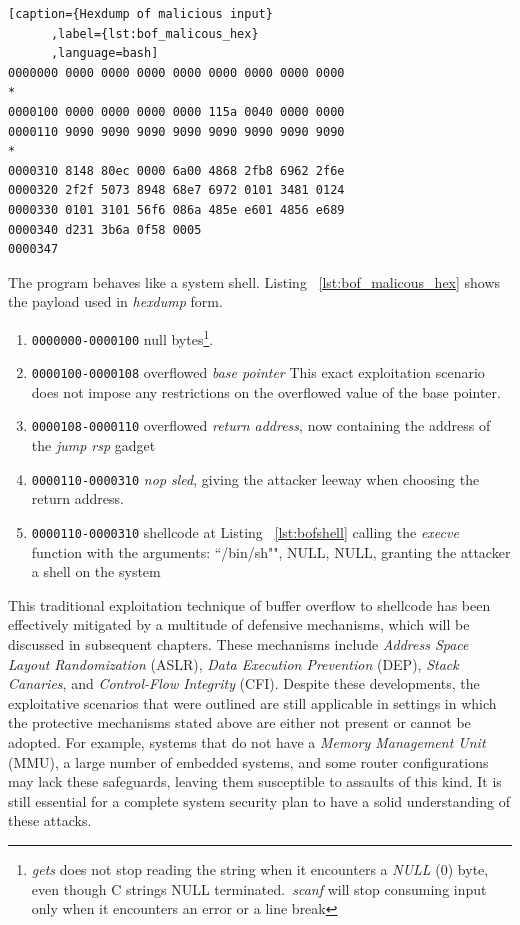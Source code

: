 \documentclass{article}
\begin{document}
\begin{lstlisting}[caption={Hexdump of malicious input}
      ,label={lst:bof_malicous_hex}
      ,language=bash]
0000000 0000 0000 0000 0000 0000 0000 0000 0000
*
0000100 0000 0000 0000 0000 115a 0040 0000 0000
0000110 9090 9090 9090 9090 9090 9090 9090 9090
*
0000310 8148 80ec 0000 6a00 4868 2fb8 6962 2f6e
0000320 2f2f 5073 8948 68e7 6972 0101 3481 0124
0000330 0101 3101 56f6 086a 485e e601 4856 e689
0000340 d231 3b6a 0f58 0005
0000347
\end{lstlisting}
The program behaves like a system shell. Listing ~\ref{lst:bof_malicous_hex} shows the payload used in \emph{hexdump} form. 
\begin{enumerate}
  \item \texttt{0000000-0000100} null bytes\footnote{\emph{gets} does not stop reading the string when it encounters a \emph{NULL} (0) byte, even though C strings NULL terminated.~\emph{scanf} will stop consuming input only when it encounters an error or a line break}.
  \item \texttt{0000100-0000108} overflowed \emph{base pointer} This exact exploitation scenario does not impose any restrictions on the overflowed value of the base pointer.
  \item \texttt{0000108-0000110} overflowed \emph{return address}, now containing the address of the \emph{jump rsp} gadget
  \item \texttt{0000110-0000310} \emph{nop sled}, giving the attacker leeway when choosing the return address.
  \item \texttt{0000110-0000310} shellcode at Listing ~\ref{lst:bofshell} calling the \emph{execve} function with the arguments: ``/bin/sh"", NULL, NULL, granting the attacker a shell on the system
\end{enumerate}

This traditional exploitation technique of buffer overflow to shellcode has been effectively mitigated by a multitude of defensive mechanisms, which will be discussed in subsequent chapters. These mechanisms include \emph{Address Space Layout Randomization} (ASLR), \emph{Data Execution Prevention} (DEP), \emph{Stack Canaries}, and \emph{Control-Flow Integrity} (CFI). Despite these developments, the exploitative scenarios that were outlined are still applicable in settings in which the protective mechanisms stated above are either not present or cannot be adopted. For example, systems that do not have a \emph{Memory Management Unit} (MMU), a large number of embedded systems, and some router configurations may lack these safeguards, leaving them susceptible to assaults of this kind. It is still essential for a complete system security plan to have a solid understanding of these attacks.
\end{document}
